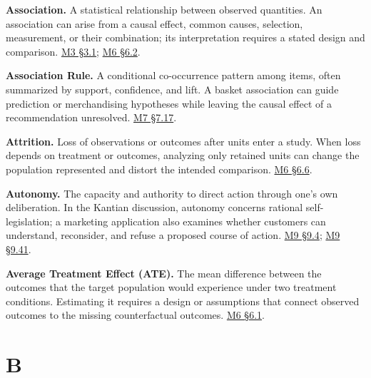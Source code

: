 \noindent\textbf{Association.} A statistical relationship between observed
quantities. An association can arise from a causal effect, common
causes, selection, measurement, or their combination; its interpretation
requires a stated design and comparison.
\href{Marketing_Analytics_Lecture_Notes.pdf\#M03-a-conditional-mean-and-a-regression-line}{M3
§3.1};
\href{Marketing_Analytics_Lecture_Notes.pdf\#M06-why-the-treated-untreated-difference-can-be-biased}{M6
§6.2}.

\noindent\textbf{Association Rule.} A conditional co-occurrence pattern among
items, often summarized by support, confidence, and lift. A basket
association can guide prediction or merchandising hypotheses while
leaving the causal effect of a recommendation unresolved.
\href{Marketing_Analytics_Lecture_Notes.pdf\#M07-mhealth-basket-associations-and-future-validation}{M7
§7.17}.

\noindent\textbf{Attrition.} Loss of observations or outcomes after units enter a
study. When loss depends on treatment or outcomes, analyzing only
retained units can change the population represented and distort the
intended comparison.
\href{Marketing_Analytics_Lecture_Notes.pdf\#M06-implementation-checks-that-protect-the-comparison}{M6
§6.6}.

\noindent\textbf{Autonomy.} The capacity and authority to direct action through
one's own deliberation. In the Kantian discussion, autonomy concerns
rational self-legislation; a marketing application also examines whether
customers can understand, reconsider, and refuse a proposed course of
action.
\hyperref[M09-respect-for-persons-and-commercial-exchange]{M9
§9.4};
\hyperref[M09-phenomena-noumena-and-the-ends-of-analysis]{M9
§9.41}.

\noindent\textbf{Average Treatment Effect (ATE).} The mean difference between the
outcomes that the target population would experience under two treatment
conditions. Estimating it requires a design or assumptions that connect
observed outcomes to the missing counterfactual outcomes.
\href{Marketing_Analytics_Lecture_Notes.pdf\#M06-define-the-treatment-outcome-and-estimand}{M6
§6.1}.

\par{}
\hypertarget{module-b}{%
\section*{B}\label{module-b}}

